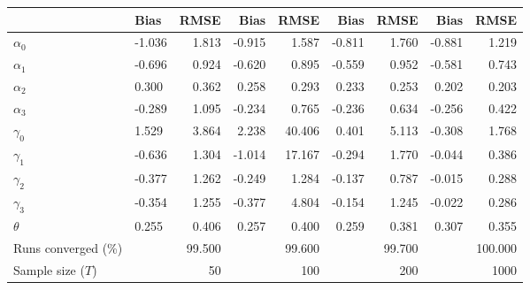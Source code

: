 
\begin{tabular}[t]{llrrrrrrr}
\toprule
  & Bias & RMSE & Bias & RMSE & Bias & RMSE & Bias & RMSE\\
\midrule
$\alpha_{0}$ & -1.036 & 1.813 & -0.915 & 1.587 & -0.811 & 1.760 & -0.881 & 1.219\\
$\alpha_{1}$ & -0.696 & 0.924 & -0.620 & 0.895 & -0.559 & 0.952 & -0.581 & 0.743\\
$\alpha_{2}$ & 0.300 & 0.362 & 0.258 & 0.293 & 0.233 & 0.253 & 0.202 & 0.203\\
$\alpha_{3}$ & -0.289 & 1.095 & -0.234 & 0.765 & -0.236 & 0.634 & -0.256 & 0.422\\
$\gamma_{0}$ & 1.529 & 3.864 & 2.238 & 40.406 & 0.401 & 5.113 & -0.308 & 1.768\\
$\gamma_{1}$ & -0.636 & 1.304 & -1.014 & 17.167 & -0.294 & 1.770 & -0.044 & 0.386\\
$\gamma_{2}$ & -0.377 & 1.262 & -0.249 & 1.284 & -0.137 & 0.787 & -0.015 & 0.288\\
$\gamma_{3}$ & -0.354 & 1.255 & -0.377 & 4.804 & -0.154 & 1.245 & -0.022 & 0.286\\
$\theta$ & 0.255 & 0.406 & 0.257 & 0.400 & 0.259 & 0.381 & 0.307 & 0.355\\
Runs converged (\%) &  & 99.500 &  & 99.600 &  & 99.700 &  & 100.000\\
Sample size ($T$) &  & 50 &  & 100 &  & 200 &  & 1000\\
\bottomrule
\end{tabular}

